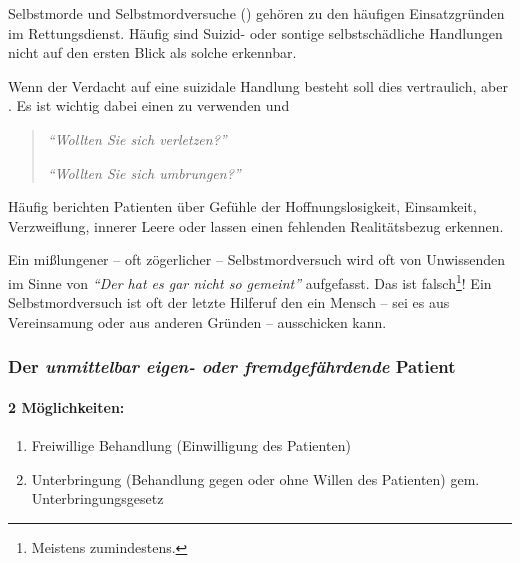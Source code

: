 Selbstmorde und Selbstmordversuche () gehören zu den
häufigen Einsatzgründen im Rettungsdienst. Häufig sind
Suizid- oder sontige selbstschädliche Handlungen nicht auf
den ersten Blick als solche erkennbar. 

Wenn der Verdacht auf eine suizidale Handlung besteht soll
dies vertraulich, aber . Es ist wichtig dabei einen 
zu verwenden und 

\begin{quotation}
\emph{"`Wollten Sie sich verletzen?"'}

\emph{"`Wollten Sie sich umbrungen?"'}
\end{quotation}

Häufig berichten Patienten über Gefühle der
Hoffnungslosigkeit, Einsamkeit, Verzweiflung, innerer Leere
oder lassen einen fehlenden Realitätsbezug erkennen.


Ein mißlungener -- oft zögerlicher -- Selbstmordversuch
wird oft von Unwissenden im Sinne von \emph{"`Der hat es gar nicht so gemeint"'}
aufgefasst. Das ist falsch\footnote{Meistens zumindestens.}!
Ein Selbstmordversuch ist oft der letzte Hilferuf den ein
Mensch -- sei es aus Vereinsamung oder aus anderen Gründen
-- ausschicken kann. 



\subsubsection{Der \emph{unmittelbar eigen- oder
fremdgefährdende} Patient}


\paragraph{2 Möglichkeiten:}

\begin{enumerate}
    \item Freiwillige Behandlung (Einwilligung des Patienten)
    \item Unterbringung (Behandlung gegen oder ohne Willen
    des Patienten) gem. Unterbringungsgesetz
\end{enumerate}



